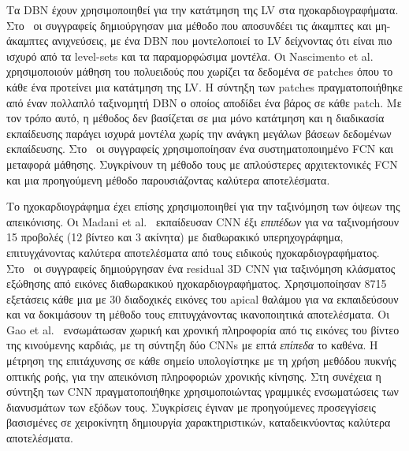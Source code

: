 Τα DBN έχουν χρησιμοποιηθεί για την κατάτμηση της LV στα ηχοκαρδιογραφήματα.
Στο~\cite{carneiro2012segmentation} οι συγγραφείς δημιούργησαν μια μέθοδο που αποσυνδέει τις άκαμπτες και μη-άκαμπτες ανιχνεύσεις, με ένα DBN που μοντελοποιεί το LV δείχνοντας ότι είναι πιο ισχυρό από τα level-sets και τα παραμορφώσιμα μοντέλα.
Οι Nascimento et al.~\cite{nascimento2016multi} χρησιμοποιούν μάθηση του πολυειδούς που χωρίζει τα δεδομένα σε patches όπου το κάθε ένα προτείνει μια κατάτμηση της LV\@.
Η σύντηξη των patches πραγματοποιήθηκε από έναν πολλαπλό ταξινομητή DBN ο οποίος αποδίδει ένα βάρος σε κάθε patch.
Με τον τρόπο αυτό, η μέθοδος δεν βασίζεται σε μια μόνο κατάτμηση και η διαδικασία εκπαίδευσης παράγει ισχυρά μοντέλα χωρίς την ανάγκη μεγάλων βάσεων δεδομένων εκπαίδευσης.
Στο~\cite{chen2016iterative} οι συγγραφείς χρησιμοποίησαν ένα συστηματοποιημένο FCN και μεταφορά μάθησης.
Συγκρίνουν τη μέθοδο τους με απλούστερες αρχιτεκτονικές FCN και μια προηγούμενη μέθοδο παρουσιάζοντας καλύτερα αποτελέσματα.

Το ηχοκαρδιογράφημα έχει επίσης χρησιμοποιηθεί για την ταξινόμηση των όψεων της απεικόνισης.
Οι Madani et al.~\cite{madani2018fast} εκπαίδευσαν CNN έξι \textit{επιπέδων} για να ταξινομήσουν 15 προβολές (12 βίντεο και 3 ακίνητα) με διαθωρακικό υπερηχογράφημα, επιτυγχάνοντας καλύτερα αποτελέσματα από τους ειδικούς ηχοκαρδιογραφήματος.
Στο~\cite{silva2018ejection} οι συγγραφείς δημιούργησαν ένα residual 3D CNN για ταξινόμηση κλάσματος εξώθησης από εικόνες διαθωρακικού ηχοκαρδιογραφήματος.
Χρησιμοποίησαν 8715 εξετάσεις κάθε μια με 30 διαδοχικές εικόνες του apical θαλάμου για να εκπαιδεύσουν και να δοκιμάσουν τη μέθοδο τους επιτυγχάνοντας ικανοποιητικά αποτελέσματα.
Οι Gao et al.~\cite{gao2017fused} ενσωμάτωσαν χωρική και χρονική πληροφορία από τις εικόνες του βίντεο της κινούμενης καρδιάς, με τη σύντηξη δύο CNNs με επτά \textit{επίπεδα} το καθένα.
Η μέτρηση της επιτάχυνσης σε κάθε σημείο υπολογίστηκε με τη χρήση μεθόδου πυκνής οπτικής ροής, για την απεικόνιση πληροφοριών χρονικής κίνησης.
Στη συνέχεια η σύντηξη των CNN πραγματοποιήθηκε χρησιμοποιώντας γραμμικές ενσωματώσεις των διανυσμάτων των εξόδων τους.
Συγκρίσεις έγιναν με προηγούμενες προσεγγίσεις βασισμένες σε χειροκίνητη δημιουργία χαρακτηριστικών, καταδεικνύοντας καλύτερα αποτελέσματα.

